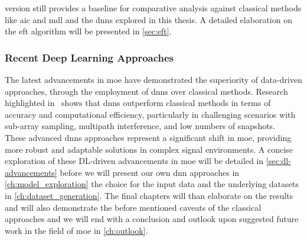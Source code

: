 version still provides a baseline for comparative analysis against classical methods like \gls{aic} and \gls{mdl} and
the \glspl{dnn} explored in this thesis. A detailed elaboration on the \gls{eft} algorithm will be presented in \autoref{sec:eft}.

\subsubsection*{Recent Deep Learning Approaches}
The latest advancements in \gls{moe} have demonstrated the superiority of data-driven approaches, through the employment
of \glspl{dnn} over classical methods.
Research highlighted in~\cite{barthelme2020, barthelme21sub, yu22RCNN, yang2020, rogers2021} shows that \glspl{dnn}
outperform classical methods in terms of accuracy and computational efficiency, particularly in
challenging scenarios with sub-array sampling, multipath interference, and low numbers of snapshots.\\
These advanced \glspl{dnn} approaches represent a significant shift in \gls{moe}, providing more robust and adaptable
solutions in complex signal environments. A concise exploration of these DL-driven advancements in \gls{moe} will be
detailed in \autoref{sec:dl-advancements} before we will present our own \gls{dnn} approaches in \autoref{ch:model_exploration}
the choice for the input data and the underlying datasets in \autoref{ch:dataset_generation}.
The final chapters will than elaborate on the results and will also demonstrate the before mentioned caveats of the
classical approaches and we will end with a conclusion and outlook upon suggested future work in the field of \gls{moe}
in \autoref{ch:outlook}.

\endinput


